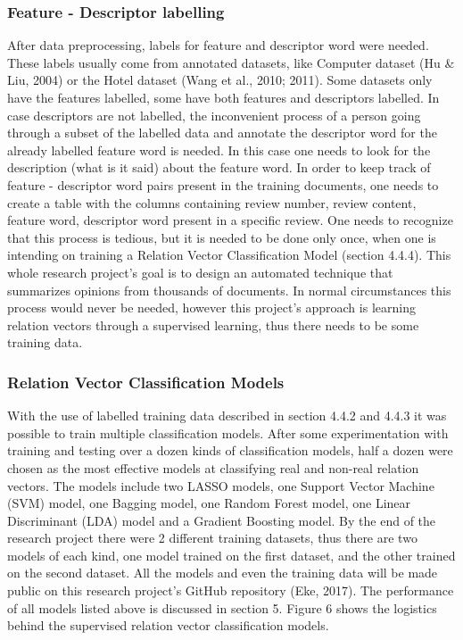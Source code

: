 \documentclass{sig-alternate}
\begin{document}
\subsubsection{Feature - Descriptor labelling}
After data preprocessing, labels for feature and descriptor word were needed. These labels usually come from annotated datasets, like Computer dataset (Hu \& Liu, 2004) or the Hotel dataset (Wang et al., 2010; 2011). Some datasets only have the features labelled, some have both features and descriptors labelled. In case descriptors are not labelled, the inconvenient process of a person going through a subset of the labelled data and annotate the descriptor word for the already labelled feature word is needed. In this case one needs to look for the description (what is it said) about the feature word. In order to keep track of feature - descriptor word pairs present in the training documents, one needs to create a table with the columns containing review number, review content, feature word, descriptor word present in a specific review. One needs to recognize that this process is tedious, but it is needed to be done only once, when one is intending on training a Relation Vector Classification Model (section 4.4.4). This whole research project's goal is to design an automated technique that summarizes opinions from thousands of documents. In normal circumstances this process would never be needed, however this project's approach is learning relation vectors through a supervised learning, thus there needs to be some training data.

\subsubsection{Relation Vector Classification Models}
With the use of labelled training data described in section 4.4.2 and 4.4.3 it was possible to train multiple classification models. After some experimentation with training and testing over a dozen kinds of classification models, half a dozen were chosen as the most effective models at classifying real and non-real relation vectors. The models include two LASSO models, one Support Vector Machine (SVM) model, one Bagging model, one Random Forest model, one Linear Discriminant (LDA) model and a Gradient Boosting model. By the end of the research project there were 2 different training datasets, thus there are two models of each kind, one model trained on the first dataset, and the other trained on the second dataset. 
All the models and even the training data will be made public on this research project's GitHub repository (Eke, 2017). The performance of all models listed above is discussed in section 5. Figure 6 shows the logistics behind the supervised relation vector classification models.
\end{document}
